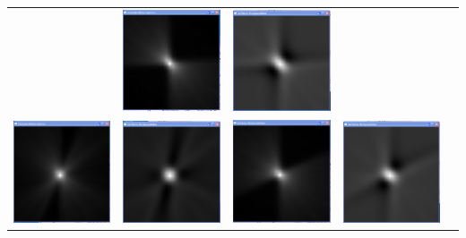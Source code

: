 \begin{longtable}{p{3cm}p{3cm}p{3cm}p{3cm}c}
                  &
                  \includegraphics[width=.2\textwidth, height=0.125\textheight]{pic/Einzelfenster_Bilder/isotrope_Messung/iso3einf_rueckprj.png}
                  & 
                  \includegraphics[width=.2\textwidth, height=0.125\textheight]{pic/Einzelfenster_Bilder/isotrope_Messung/iso3gef_prj.png}\\
                  \includegraphics[width=.2\textwidth, height=0.125\textheight]{pic/Einzelfenster_Bilder/inhomogene_Messung/inhomo4einf_rueckprj.png}
                  & 
                  \includegraphics[width=.2\textwidth, height=0.125\textheight]{pic/Einzelfenster_Bilder/inhomogene_Messung/inhomo4gef_prj.png}
                  &
                  \includegraphics[width=.2\textwidth, height=0.125\textheight]{pic/Einzelfenster_Bilder/isotrope_Messung/iso4einf_prj.png}
                  & 
                  \includegraphics[width=.2\textwidth, height=0.125\textheight]{pic/Einzelfenster_Bilder/isotrope_Messung/iso4gef_prj.png}\\

\end{longtable}

